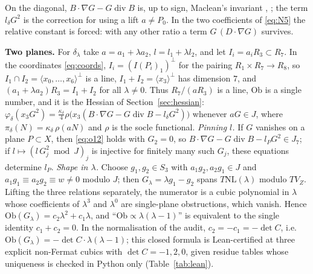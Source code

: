 \documentclass[10pt]{article}
\numberwithin{equation}{section}
\theoremstyle{remark}
\newcommand{\NL}{\mathrm{NL}}
\newcommand{\VZ}{V_Z}
\newcommand{\dv}{\operatorname{div}}
\newcommand{\run}[1]{\medskip\noindent\textbf{#1}}
\begin{document}
On the diagonal, $B\cdot\nabla G-G\dv B$ is, up to sign, Maclean's invariant \cite[Theorem~23]{Mac1},
\cite{Mac2}; the term $l_\delta G^2$ is the correction for using a lift $a\neq P_0$. In the two coefficients of
\eqref{eq:N5} the relative constant is forced: with any other ratio a term $G\,(D\cdot\nabla G)$ survives.

\run{Two planes.} For $\delta_\lambda$ take $a=a_1+\lambda a_2$, $l=l_1+\lambda l_2$, and let
$I_i=a_iR_3\subset R_7$. In the coordinates \eqref{eq:coords}, $I_i=(I(P_i)_1)^{\perp}$ for the pairing
$R_1\times R_7\to R_8$, so $I_1\cap I_2=\langle x_0,\dots,x_6\rangle^\perp$ is a line,
$I_1+I_2=\langle x_3\rangle^\perp$ has dimension $7$, and $(a_1+\lambda a_2)R_3=I_1+I_2$ for all $\lambda\neq0$.
Thus $R_7/(aR_3)$ is a line, $\mathrm{Ob}$ is a single number, and it is the Hessian of
Section~\ref{sec:hessian}: $\varphi_\delta(x_3G^2)=\frac{\kappa_\delta}4\rho\bigl(x_3(B\cdot\nabla G-G\dv B-l_\delta
G^2)\bigr)$ whenever $aG\in J$, where $\pi_\delta(N)=\kappa_\delta\,\rho(aN)$ and $\rho$ is the socle functional.
\emph{Pinning $l$.} If $G$ vanishes on a plane $P\subset X$, then \eqref{eq:o12} holds with $G_2=0$, so
$B\cdot\nabla G-G\dv B-l_PG^2\in J_7$; if $l\mapsto(l\,G_j^2\bmod J)_j$ is injective for finitely many such
$G_j$, these equations determine $l_P$. \emph{Shape in $\lambda$.} Choose $g_1,g_2\in S_3$ with
$a_1g_2,a_2g_1\in J$ and $a_1g_1\equiv a_2g_2\equiv w\neq0$ modulo $J$; then $G_\lambda=\lambda g_1-g_2$ spans
$T\NL(\lambda)$ modulo $T\VZ$. Lifting the three relations separately, the numerator is a cubic polynomial in
$\lambda$ whose coefficients of $\lambda^3$ and $\lambda^0$ are single-plane obstructions, which vanish. Hence
$\mathrm{Ob}(G_\lambda)=c_2\lambda^2+c_1\lambda$, and ``$\mathrm{Ob}\propto\lambda(\lambda-1)$'' is equivalent to
the single identity $c_1+c_2=0$. In the normalisation of the audit, $c_2=-c_1=-\det C$, i.e.\
$\mathrm{Ob}(G_\lambda)=-\det C\cdot\lambda(\lambda-1)$; this closed formula is Lean-certified at three explicit
non-Fermat cubics with $\det C=-1,2,0$, given residue tables whose uniqueness is checked in Python only
(Table~\ref{tab:lean}).
\end{document}

